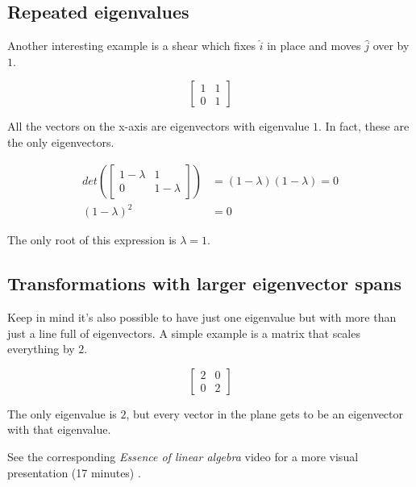 \subsection{Repeated eigenvalues}

Another interesting example is a shear which fixes $\hat{i}$ in place and moves
$\hat{j}$ over by $1$.

\begin{equation*}
  \begin{bmatrix}
    1 & 1 \\
    0 & 1
  \end{bmatrix}
\end{equation*}

All the vectors on the x-axis are eigenvectors with eigenvalue $1$. In fact,
these are the only eigenvectors.

\begin{align*}
  det\left(\begin{bmatrix}
    1 - \lambda & 1 \\
    0 & 1 - \lambda
  \end{bmatrix}\right) &= (1 - \lambda)(1 - \lambda) = 0 \\
  (1 - \lambda)^2 &= 0
\end{align*}

The only root of this expression is $\lambda = 1$.

\subsection{Transformations with larger eigenvector spans}

Keep in mind it's also possible to have just one eigenvalue but with more than
just a line full of eigenvectors. A simple example is a matrix that scales
everything by $2$.

\begin{equation*}
  \begin{bmatrix}
    2 & 0 \\
    0 & 2
  \end{bmatrix}
\end{equation*}

The only eigenvalue is $2$, but every vector in the plane gets to be an
eigenvector with that eigenvalue.

\begin{remark}
  See the corresponding \textit{Essence of linear algebra} video for a more
  visual presentation (17 minutes)
  \cite{bib:linalg_eigenvectors_and_eigenvalues}.
\end{remark}
